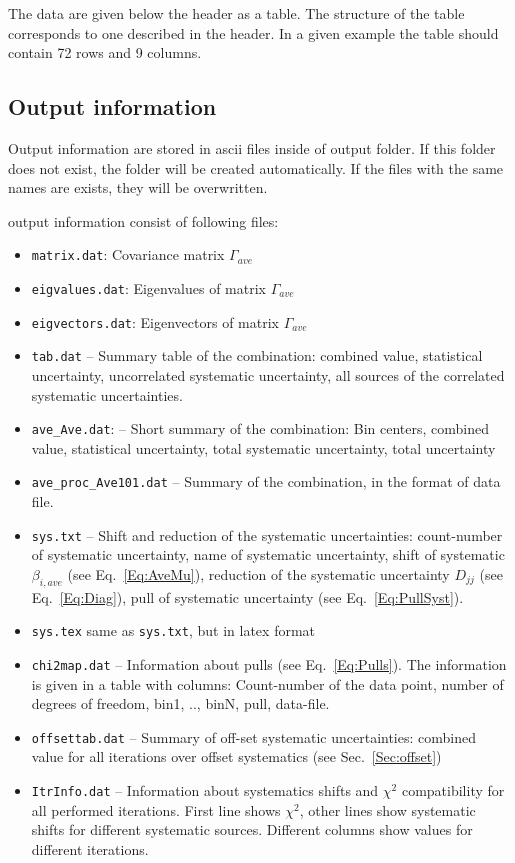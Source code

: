 The data are given below the header as a table. The structure of the table corresponds to one described in the header. In a given example the table should contain 72 rows and 9 columns.

\subsection{Output information}
\label{Sec:Output}

Output information are stored in ascii files inside of output folder. If this folder does not exist, the folder will be created automatically. If the files with the same names are exists, they will be overwritten.

output information consist of following files:
\begin{itemize}
\item {\tt matrix.dat}: Covariance matrix $\Gamma_{ave}$
\item {\tt eigvalues.dat}: Eigenvalues of matrix $\Gamma_{ave}$
\item {\tt eigvectors.dat}: Eigenvectors of matrix $\Gamma_{ave}$

\item {\tt tab.dat} -- Summary table of the combination: combined value, statistical uncertainty, uncorrelated systematic uncertainty, all sources of the correlated systematic uncertainties.
\item {\tt ave\_Ave.dat}: -- Short summary of the combination: Bin centers, combined value, statistical uncertainty, total systematic uncertainty, total uncertainty 
\item {\tt ave\_proc\_Ave101.dat} -- Summary of the combination, in the format of data file.
\item {\tt sys.txt} -- Shift and reduction of the systematic uncertainties: count-number of systematic uncertainty, name of systematic uncertainty, shift of systematic $\beta_{i,ave}$ (see Eq.~\ref{Eq:AveMu}), reduction of the systematic uncertainty $D_{jj}$ (see Eq.~\ref{Eq:Diag}), pull of systematic uncertainty (see Eq.~\ref{Eq:PullSyst}).
\item {\tt sys.tex} same as {\tt sys.txt}, but in latex format
\item {\tt chi2map.dat} -- Information about pulls (see Eq.~\ref{Eq:Pulls}). The information is given in a table with columns: Count-number of the data point, number of degrees of freedom, bin1, .., binN, pull, data-file.
\item {\tt offsettab.dat} -- Summary of off-set systematic uncertainties: combined value for all iterations over offset systematics (see Sec.~\ref{Sec:offset})
\item {\tt ItrInfo.dat} -- Information about systematics shifts and $\chi^2$ compatibility for all performed iterations. First line shows $\chi^2$, other lines show systematic shifts for different systematic sources. Different columns show values for different iterations.  
\end{itemize}




  